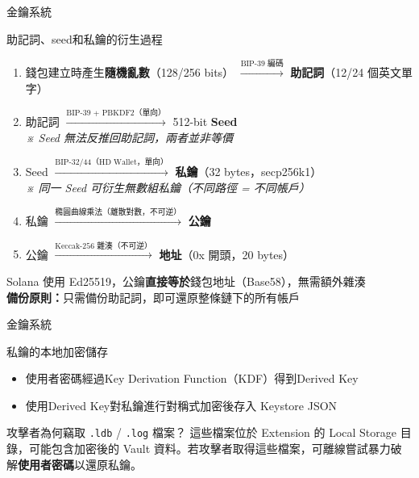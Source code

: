 \documentclass{beamer}
\begin{document}

\begin{frame}{金鑰系統}
  \begin{block}{助記詞、seed和私鑰的衍生過程}
    \small
    \begin{enumerate}
      \item 錢包建立時產生\textbf{隨機亂數}（128/256 bits）
            $\xrightarrow{\text{BIP-39 編碼}}$
            \textbf{助記詞}（12/24 個英文單字）
      \item 助記詞
            $\xrightarrow{\text{BIP-39 + PBKDF2（單向）}}$
            512-bit \textbf{Seed}\\
            \textit{※ Seed 無法反推回助記詞，兩者並非等價}
      \item Seed
            $\xrightarrow{\text{BIP-32/44（HD Wallet，單向）}}$
            \textbf{私鑰}（32 bytes，secp256k1）\\
            \textit{※ 同一 Seed 可衍生無數組私鑰（不同路徑 = 不同帳戶）}
      \item 私鑰
            $\xrightarrow{\text{橢圓曲線乘法（離散對數，不可逆）}}$
            \textbf{公鑰}
      \item 公鑰
            $\xrightarrow{\text{Keccak-256 雜湊（不可逆）}}$
            \textbf{地址}（0x 開頭，20 bytes）
    \end{enumerate}
  \end{block}
  \vspace{0.1cm}
  \small Solana 使用 Ed25519，公鑰\textbf{直接等於}錢包地址（Base58），無需額外雜湊\\
  \textbf{備份原則：}只需備份助記詞，即可還原整條鏈下的所有帳戶
\end{frame}

\begin{frame}{金鑰系統}
  \begin{block}{私鑰的本地加密儲存}
    \begin{itemize}
      \item 使用者密碼經過Key Derivation Function（KDF）得到Derived Key
      \item 使用Derived Key對私鑰進行對稱式加密後存入 Keystore JSON
    \end{itemize}
  \end{block}

  \begin{alertblock}{攻擊者為何竊取 \texttt{.ldb} / \texttt{.log} 檔案？}
    這些檔案位於 Extension 的 Local Storage 目錄，可能包含加密後的 Vault 資料。若攻擊者取得這些檔案，可離線嘗試暴力破解\textbf{使用者密碼}以還原私鑰。
  \end{alertblock}
\end{frame}
\end{document}
